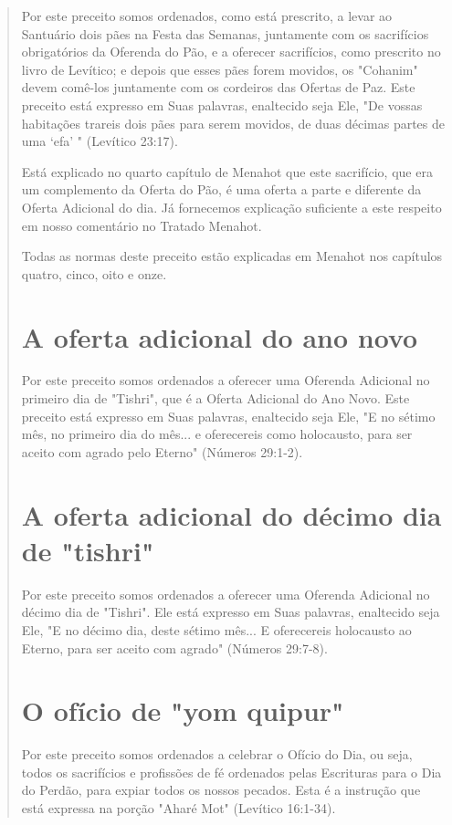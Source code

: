 \begin{quote}
Por este preceito somos ordenados, como está prescrito, a levar ao
Santuário dois pães na Festa das Semanas, juntamente com os sacrifícios
obri­gatórios da Oferenda do Pão, e a oferecer sacrifícios, como
prescrito no livro de Levítico; e depois que esses pães forem movidos,
os "Cohanim" devem comê-los juntamente com os cordeiros das Ofertas de
Paz. Este preceito está expres­so em Suas palavras, enaltecido seja Ele,
"De vossas habitações trareis dois pães para serem movidos, de duas
décimas partes de uma `efa' " (Levítico 23:17).

Está explicado no quarto capítulo de Menahot que este sacrifício, que
era um complemento da Oferta do Pão, é uma oferta a parte e diferente da
Oferta Adicional do dia. Já fornecemos explicação suficiente a este
respeito em nosso comentário no Tratado Menahot.

Todas as normas deste preceito estão explicadas em Menahot nos capítulos
quatro, cinco, oito e onze.

\section{A oferta adicional do ano novo}

Por este preceito somos ordenados a oferecer uma Oferenda Adi­cional no
primeiro dia de "Tishri", que é a Oferta Adicional do Ano Novo. Este
preceito está expresso em Suas palavras, enaltecido seja Ele, "E no
sétimo mês, no primeiro dia do mês... e oferecereis como holocausto,
para ser aceito com agrado pelo Eterno" (Números 29:1-2).

\section{A oferta adicional do décimo dia de "tishri"}

Por este preceito somos ordenados a oferecer uma Oferenda Adi­cional no
décimo dia de "Tishri". Ele está expresso em Suas palavras, enalteci­do
seja Ele, "E no décimo dia, deste sétimo mês... E oferecereis holocausto
ao Eterno, para ser aceito com agrado" (Números 29:7-8).

\section{O ofício de "yom quipur"}

Por este preceito somos ordenados a celebrar o Ofício do Dia, ou seja,
todos os sacrifícios e profissões de fé ordenados pelas Escrituras para
o Dia do Perdão, para expiar todos os nossos pecados. Esta é a instrução
que está expressa na porção "Aharé Mot" (Levítico 16:1-34).




\end{quote}

